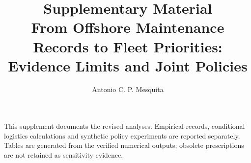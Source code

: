 \documentclass[11pt,a4paper]{article}
\title{Supplementary Material\\[0.5em]\large From Offshore Maintenance Records to Fleet Priorities: Evidence Limits and Joint Policies}
\author{Antonio C. P. Mesquita}
\date{}
\begin{document}
\maketitle
This supplement documents the revised analyses. Empirical records, conditional logistics calculations and synthetic policy experiments are reported separately. Tables are generated from the verified numerical outputs; obsolete prescriptions are not retained as sensitivity evidence.

\end{document}
